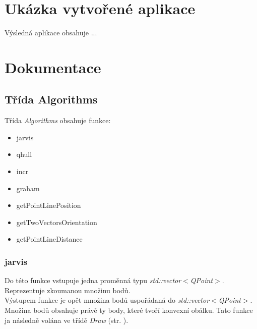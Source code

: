 \documentclass{article}
\begin{document}
\newpage
\section{Ukázka vytvořené aplikace}
Výsledná aplikace obsahuje ...
%

\newpage
\section{Dokumentace \label{sec:alg}}
\subsection{Třída Algorithms}
Třída \emph{Algorithms} obsahuje funkce:
\begin{itemize}
\item jarvis
\item qhull
\item incr
\item graham
\item getPointLinePosition
\item getTwoVectorsOrientation
\item getPointLineDistance
\end{itemize}

\subsubsection{jarvis}
Do této funkce vstupuje jedna proměnná typu  \emph{std::vector$<$QPoint$>$}. Reprezentuje zkoumanou množinu bodů.\\
Výstupem funkce je opět množina bodů uspořádaná do \emph{std::vector$<$QPoint$>$}. Množina bodů obsahuje právě ty body, které tvoří konvexní obálku. Tato funkce ja následně volána ve třídě \emph{Draw} (str. \pageref{sec:draw}).
\end{document}
